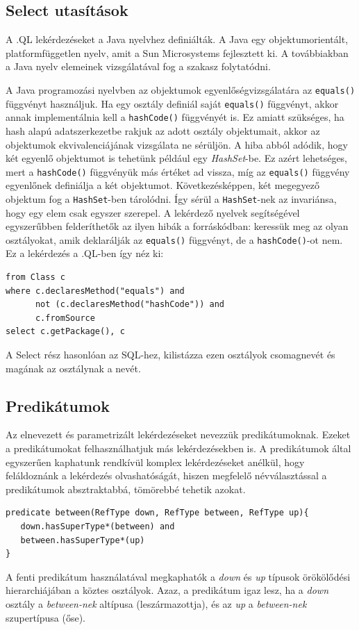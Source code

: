 \documentclass[a4paper,12pt]{report}
\begin{document}
\subsection{Select utasítások}
\par A .QL lekérdezéseket a Java nyelvhez definiálták. A Java egy objektumorientált, platformfüggetlen nyelv, amit a Sun Microsystems fejlesztett ki. A továbbiakban a Java nyelv elemeinek vizsgálatával fog a szakasz folytatódni. 
\par A Java programozási nyelvben az objektumok egyenlőségvizsgálatára az \texttt{equals()} függvényt használjuk. Ha egy osztály definiál saját \texttt{equals()} függvényt, akkor annak implementálnia kell a \texttt{hashCode()} függvényét is. Ez amiatt szükséges, ha hash alapú adatszerkezetbe rakjuk az adott osztály objektumait, akkor az objektumok ekvivalenciájának vizsgálata ne sérüljön. A hiba abból adódik, hogy két egyenlő objektumot is tehetünk például egy \textit{HashSet}-be. Ez azért lehetséges, mert a \texttt{hashCode()} függvényük más értéket ad vissza, míg az \texttt{equals()} függvény egyenlőnek definiálja a két objektumot. Következésképpen, két megegyező objektum fog a \texttt{HashSet}-ben tárolódni. Így sérül a \texttt{HashSet}-nek az invariánsa, hogy egy elem csak egyszer szerepel. A lekérdező nyelvek segítségével egyszerűbben felderíthetők az ilyen hibák a forráskódban: keressük meg az olyan osztályokat, amik deklarálják az \texttt{equals()} függvényt, de a \texttt{hashCode()}-ot nem. Ez a lekérdezés a .QL-ben így néz ki:
\begin{verbatim}
from Class c
where c.declaresMethod("equals") and
      not (c.declaresMethod("hashCode")) and
      c.fromSource
select c.getPackage(), c
\end{verbatim}
A Select rész hasonlóan az SQL-hez, kilistázza ezen osztályok csomagnevét és magának az osztálynak a nevét.
\subsection{Predikátumok}
\par Az elnevezett és parametrizált lekérdezéseket nevezzük predikátumoknak. Ezeket a predikátumokat felhasználhatjuk más lekérdezésekben is. A predikátumok által egyszerűen kaphatunk rendkívül komplex lekérdezéseket anélkül, hogy feláldoznánk a lekérdezés olvashatóságát, hiszen megfelelő névválasztással a predikátumok absztraktabbá, tömörebbé tehetik azokat.
\begin{verbatim}
predicate between(RefType down, RefType between, RefType up){
   down.hasSuperType*(between) and
   between.hasSuperType*(up)
}
\end{verbatim}
A fenti predikátum használatával megkaphatók a \textit{down} és \textit{up} típusok örökölődési hierarchiájában a köztes osztályok. Azaz, a predikátum igaz lesz, ha a \textit{down} osztály a \textit{between-nek} altípusa (leszármazottja), és az \textit{up} a \textit{between-nek} szupertípusa (őse).
\end{document}
